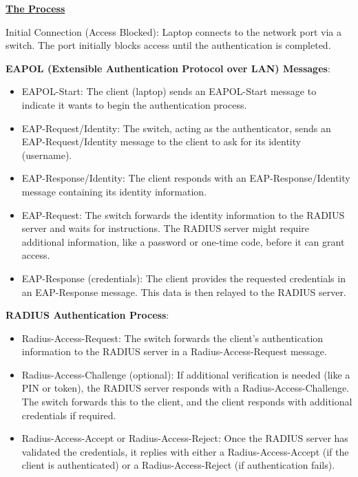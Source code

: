 \begin{center}
    \textbf{\underline{The Process}}
\end{center}
Initial Connection (Access Blocked): Laptop connects to the network port via a switch. The port initially blocks access until the authentication is completed.

\hfill 

\textbf{EAPOL (Extensible Authentication Protocol over LAN) Messages}:
\begin{itemize}
    \item EAPOL-Start: The client (laptop) sends an EAPOL-Start message to indicate it wants to begin the authentication process.
    \item EAP-Request/Identity: The switch, acting as the authenticator, sends an EAP-Request/Identity message to the client to ask for its identity (username).
    \item EAP-Response/Identity: The client responds with an EAP-Response/Identity message containing its identity information.
    \item EAP-Request: The switch forwards the identity information to the RADIUS server and waits for instructions. The RADIUS server might require additional information, like a password or one-time code, before it can grant access.
    \item EAP-Response (credentials): The client provides the requested credentials in an EAP-Response message. This data is then relayed to the RADIUS server.
\end{itemize}

\textbf{RADIUS Authentication Process}:
\begin{itemize}
    \item Radius-Access-Request: The switch forwards the client’s authentication information to the RADIUS server in a Radius-Access-Request message.
    \item Radius-Access-Challenge (optional): If additional verification is needed (like a PIN or token), the RADIUS server responds with a Radius-Access-Challenge. The switch forwards this to the client, and the client responds with additional credentials if required.
    \item Radius-Access-Accept or Radius-Access-Reject: Once the RADIUS server has validated the credentials, it replies with either a Radius-Access-Accept (if the client is authenticated) or a Radius-Access-Reject (if authentication fails).
\end{itemize}

